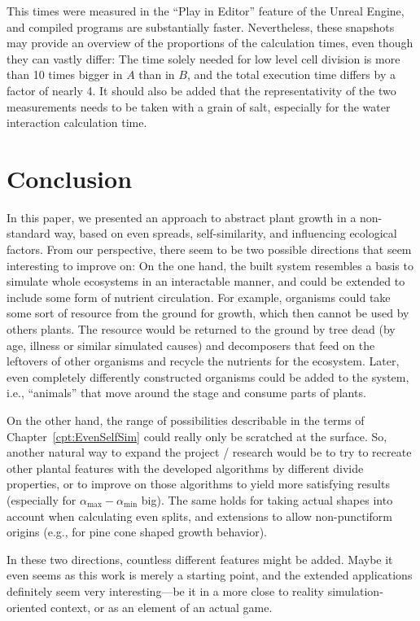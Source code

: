 \documentclass[11pt, abstract=on]{scrartcl}
\begin{document}
This times were measured in the ``Play in Editor'' feature of the Unreal Engine, and compiled programs are substantially faster. Nevertheless, these snapshots may provide an overview of the proportions of the calculation times, even though they can vastly differ: The time solely needed for low level cell division is more than 10 times bigger in $A$ than in $B$, and the total execution time differs by a factor of nearly 4. It should also be added that the representativity of the two measurements needs to be taken with a grain of salt, especially for the water interaction calculation time.

\section{Conclusion}
In this paper, we presented an approach to abstract plant growth in a non-standard way, based on even spreads, self-similarity, and influencing ecological factors. From our perspective, there seem to be two possible directions that seem interesting to improve on: On the one hand, the built system resembles a basis to simulate whole ecosystems in an interactable manner, and could be extended to include some form of nutrient circulation. For example, organisms could take some sort of resource from the ground for growth, which then cannot be used by others plants. The resource would be returned to the ground by tree dead (by age, illness or similar simulated causes) and decomposers that feed on the leftovers of other organisms and recycle the nutrients for the ecosystem. Later, even completely differently constructed organisms could be added to the system, i.e., ``animals'' that move around the stage and consume parts of plants.

On the other hand, the range of possibilities describable in the terms of Chapter~\ref{cpt:EvenSelfSim} could really only be scratched at the surface. So, another natural way to expand the project / research would be to try to recreate other plantal features with the developed algorithms by different divide properties, or to improve on those algorithms to yield more satisfying results (especially for $\alpha_\text{max} - \alpha_\text{min}$ big). The same holds for taking actual shapes into account when calculating even splits, and extensions to allow non-punctiform origins (e.g., for pine cone shaped growth behavior).

In these two directions, countless different features might be added. Maybe it even seems as this work is merely a starting point, and the extended applications definitely seem very interesting---be it in a more close to reality simulation-oriented context, or as an element of an actual game.
\end{document}

